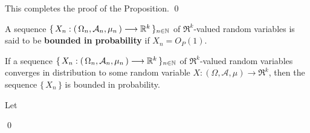 \vskip 0.3cm
\noindent
This completes the proof of the Proposition.
\qed

\begin{definition}
\mbox{}\vskip 0.1cm
\noindent
A sequence $\{\,X_{n} : \left(\,\Omega_{n},\mathcal{A}_{n},\mu_{n}\,\right) \longrightarrow \mathbb{R}^{k}\,\}_{n \in \mathbb{N}}$
of $\Re^{k}$-valued random variables is said to be \textbf{bounded in probability} if $X_{n} = O_{P}(1)$.
\end{definition}

\begin{theorem}\mbox{}\vskip 0.1cm
\noindent
If a sequence $\{\,X_{n} : \left(\,\Omega_{n},\mathcal{A}_{n},\mu_{n}\,\right) \longrightarrow \mathbb{R}^{k}\,\}_{n \in \mathbb{N}}$
of $\Re^{k}$-valued random variables converges in distribution to some random variable
$X : (\Omega,\mathcal{A},\mu) \longrightarrow \Re^{k}$,
then the sequence $\{\,X_{n}\,\}$ is bounded in probability.
\end{theorem}

\proof
Let

\qed

